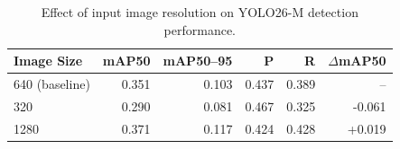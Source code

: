 \begin{table}[htbp]
\centering
\caption{Effect of input image resolution on YOLO26-M detection performance.}
\label{tab:ablation-image-size}
\begin{tabular}{lrrrrr}
\toprule
Image Size & mAP50 & mAP50--95 & P & R & $\Delta$mAP50 \\
\midrule
640 (baseline) & 0.351 & 0.103 & 0.437 & 0.389 & -- \\
320 & 0.290 & 0.081 & 0.467 & 0.325 & -0.061 \\
1280 & 0.371 & 0.117 & 0.424 & 0.428 & +0.019 \\
\bottomrule
\end{tabular}
\end{table}